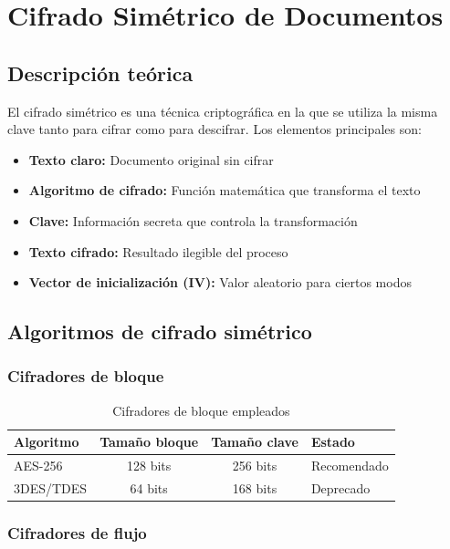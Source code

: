 \chapter{Cifrado Simétrico de Documentos}

\section{Descripción teórica}

El cifrado simétrico es una técnica criptográfica en la que se utiliza la misma clave tanto para cifrar como para descifrar. Los elementos principales son:

\begin{itemize}[label=\textbullet]
    \item \textbf{Texto claro:} Documento original sin cifrar
    \item \textbf{Algoritmo de cifrado:} Función matemática que transforma el texto
    \item \textbf{Clave:} Información secreta que controla la transformación
    \item \textbf{Texto cifrado:} Resultado ilegible del proceso
    \item \textbf{Vector de inicialización (IV):} Valor aleatorio para ciertos modos
\end{itemize}

\section{Algoritmos de cifrado simétrico}
\subsection{Cifradores de bloque}

\begin{table}[H]
    \centering
    \caption{Cifradores de bloque empleados}
    \begin{tabularx}{\textwidth}{l|c|c|p{5cm}}
        \toprule
        \textbf{Algoritmo} & \textbf{Tamaño bloque} & \textbf{Tamaño clave} & \textbf{Estado} \\
        \midrule
        AES-256 & 128 bits & 256 bits & Recomendado \\
        3DES/TDES & 64 bits & 168 bits & Deprecado \\
        \bottomrule
    \end{tabularx}
\end{table}

\subsection{Cifradores de flujo}

